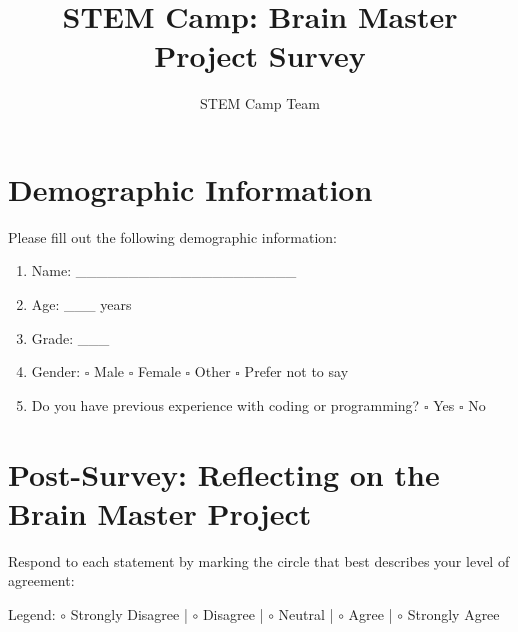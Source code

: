 \documentclass[10pt]{extarticle}
\title{STEM Camp: Brain Master Project Survey}
\author{STEM Camp Team}
\date{}
\begin{document}
\maketitle

\section*{Demographic Information}

Please fill out the following demographic information:

\begin{enumerate}
    \vspace{3mm}
    \item Name: \_\_\_\_\_\_\_\_\_\_\_\_\_\_\_\_\_\_\_\_\_
    \vspace{2mm}
    \item Age: \_\_\_ years
    \vspace{2mm}
    \item Grade: \_\_\_
    \vspace{2mm}
    \item Gender: $\square$ Male $\square$ Female $\square$ Other $\square$ Prefer not to say
    \vspace{2mm}
    \item Do you have previous experience with coding or programming? $\square$ Yes $\square$ No
    \vspace{2mm}
\end{enumerate}

\section*{Post-Survey: Reflecting on the Brain Master Project}

Respond to each statement by marking the circle that best describes your level of agreement:
\vspace{3mm}


Legend: $\circ$ Strongly Disagree | $\circ$ Disagree | $\circ$ Neutral | $\circ$ Agree | $\circ$ Strongly Agree
\end{document}
